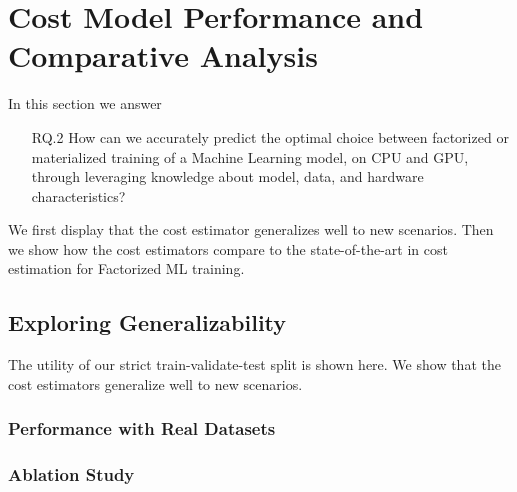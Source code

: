 
\section{Cost Model Performance and Comparative Analysis}
\label{sec:eval-model-evaluation}

In this section we answer
\begin{itemize}
  \item[RQ.2] How can we accurately predict the optimal choice between factorized or materialized training of a Machine Learning model, on CPU and GPU, through leveraging knowledge about model, data, and hardware characteristics?
\end{itemize}

We first display that the cost estimator generalizes well to new scenarios. Then we show how the cost estimators compare to the state-of-the-art in cost estimation for Factorized ML training.

\subsection{Exploring Generalizability}
The utility of our strict train-validate-test split is shown here. We show that the cost estimators generalize well to new scenarios.

\subsubsection{Performance with Real Datasets}
\label{subsubsec:6-real-datasets}

\subsubsection{Ablation Study}
\label{subsubsec:6-ablation}


